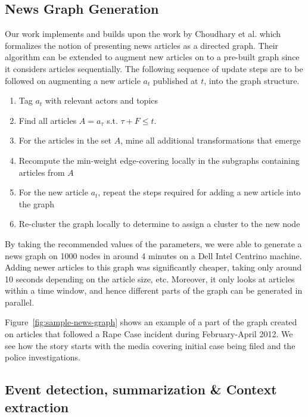 \subsection{News Graph Generation}\label{sec:graph-desc}
Our work implements and builds upon the work by Choudhary et
al.\cite{choudhary@ecir2008} which formalizes the notion of presenting
news articles as a directed graph.  Their algorithm can be extended to
augment new articles on to a pre-built graph since it considers
articles sequentially.  The following sequence of update steps are to
be followed on augmenting a new article $a_t$ published at $t$, into
the graph structure.
\begin{enumerate}
  \item Tag $a_t$ with relevant actors and topics
  \item Find all articles $A = a_\tau$ s.t. $\tau+F \leq t$.
  \item For the articles in the set $A$, mine all additional transformations that emerge
  \item Recompute the min-weight edge-covering locally in the subgraphs containing articles from $A$
  \item For the new article $a_t$, repeat the steps required for adding a new article into the graph
  \item Re-cluster the graph locally to determine to assign a cluster to the new node
\end{enumerate}
By taking the recommended values of the parameters, we were able to generate a news graph on 1000 nodes in around 4 minutes on a Dell Intel Centrino machine.
Adding newer articles to this graph was significantly cheaper, taking only around 10 seconds depending on the article size, etc.
Moreover, it only looks at articles within a time window, and hence different parts of the graph can be generated in parallel.

Figure~\ref{fig:sample-news-graph}  shows an example of a part of the graph created on articles that followed a Rape Case incident during February-April 2012. We see how the
story starts with the media covering initial case being filed and the police investigations.

\subsection{Event detection, summarization \& Context extraction}\label{sec:event-detection-summary-context}
